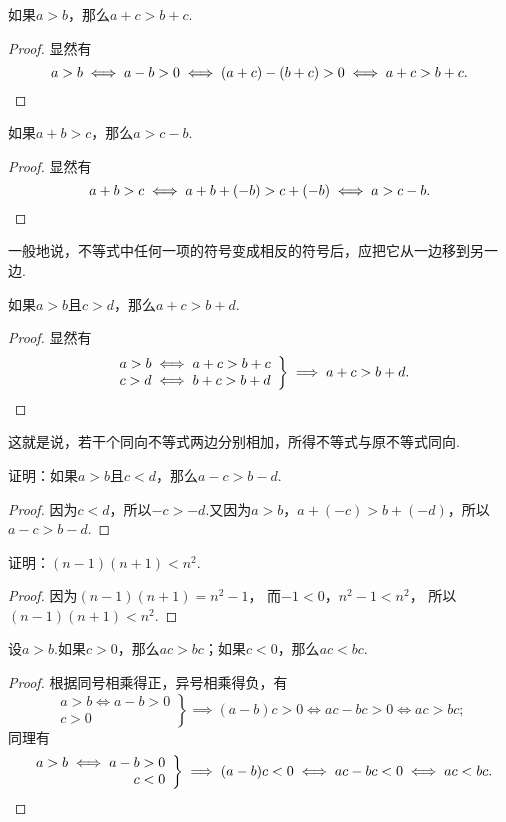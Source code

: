 \begin{theorem}
如果\(a>b\)，那么\(a+c>b+c\).
\begin{proof}
显然有\[
a>b
\iff a-b>0
\iff (a+c)-(b+c)>0
\iff a+c>b+c.
\qedhere
\]
\end{proof}
\end{theorem}

\begin{corollary}
如果\(a+b>c\)，那么\(a>c-b\).
\begin{proof}
显然有\[
a+b>c
\iff a+b+(-b)>c+(-b)
\iff a>c-b.
\qedhere
\]
\end{proof}
\end{corollary}
一般地说，不等式中任何一项的符号变成相反的符号后，应把它从一边移到另一边.

\begin{corollary}
如果\(a>b\)且\(c>d\)，那么\(a+c>b+d\).
\begin{proof}
显然有\[
\left. \begin{array}{c}
a>b \iff a+c>b+c \\
c>d \iff b+c>b+d
\end{array} \right\}
\implies a+c>b+d.
\qedhere
\]
\end{proof}
\end{corollary}
这就是说，若干个同向不等式两边分别相加，所得不等式与原不等式同向.

\begin{example}
证明：如果\(a > b\)且\(c < d\)，那么\(a - c > b - d\).
\begin{proof}
因为\(c < d\)，所以\(-c > -d\).又因为\(a > b\)，\(a + (-c) > b + (-d)\)，所以\(a - c > b - d\).
\end{proof}
\end{example}

\begin{example}
证明：\((n-1)(n+1)<n^2\).
\begin{proof}
因为\((n-1)(n+1)=n^2-1\)，
而\(-1<0\)，\(n^2-1<n^2\)，
所以\((n-1)(n+1)<n^2\).
\end{proof}
\end{example}

\begin{theorem}
设\(a>b\).如果\(c>0\)，那么\(ac>bc\)；如果\(c<0\)，那么\(ac<bc\).
\begin{proof}
根据同号相乘得正，异号相乘得负，有\[
\left. \begin{array}{r}
a>b \iff a-b>0 \\
c>0
\end{array} \right\}
\implies (a-b)c>0
\iff ac-bc>0
\iff ac>bc;
\]同理有\[
\left. \begin{array}{r}
a>b \iff a-b> 0 \\
c<0
\end{array} \right\}
\implies (a-b)c<0
\iff ac-bc<0
\iff ac<bc.
\qedhere
\]
\end{proof}
\end{theorem}

